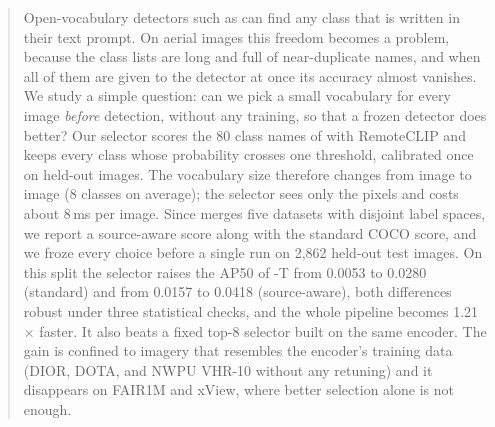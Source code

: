 \begin{abstract}
Open-vocabulary detectors such as \gdino can find any class that is written in their text prompt.
On aerial images this freedom becomes a problem, because the class lists are long and full of near-duplicate names, and when all of them are given to the detector at once its accuracy almost vanishes.
We study a simple question: can we pick a small vocabulary for every image \emph{before} detection, without any training, so that a frozen detector does better?
Our selector scores the 80 class names of \lae with RemoteCLIP and keeps every class whose probability crosses one threshold, calibrated once on held-out images.
The vocabulary size therefore changes from image to image (8 classes on average); the selector sees only the pixels and costs about 8\,ms per image.
Since \lae merges five datasets with disjoint label spaces, we report a source-aware score along with the standard COCO score, and we froze every choice before a single run on 2,862 held-out test images.
On this split the selector raises the AP50 of \gdino-T from 0.0053 to 0.0280 (standard) and from 0.0157 to 0.0418 (source-aware), both differences robust under three statistical checks, and the whole pipeline becomes 1.21$\times$ faster.
It also beats a fixed top-8 selector built on the same encoder.
The gain is confined to imagery that resembles the encoder's training data (DIOR, DOTA, and NWPU VHR-10 without any retuning) and it disappears on FAIR1M and xView, where better selection alone is not enough.
\end{abstract}
